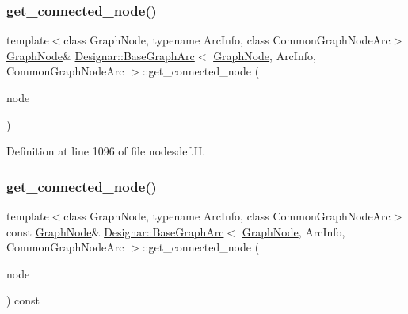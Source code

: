 \subsubsection{\texorpdfstring{get\+\_\+connected\+\_\+node()}{get\_connected\_node()}\hspace{0.1cm}{\footnotesize\ttfamily [1/2]}}
{\footnotesize\ttfamily template$<$class Graph\+Node, typename Arc\+Info, class Common\+Graph\+Node\+Arc$>$ \\
\hyperlink{class_designar_1_1_graph_node}{Graph\+Node}\& \hyperlink{class_designar_1_1_base_graph_arc}{Designar\+::\+Base\+Graph\+Arc}$<$ \hyperlink{class_designar_1_1_graph_node}{Graph\+Node}, Arc\+Info, Common\+Graph\+Node\+Arc $>$\+::get\+\_\+connected\+\_\+node (\begin{DoxyParamCaption}\item[{\hyperlink{class_designar_1_1_graph_node}{Graph\+Node} \&}]{node }\end{DoxyParamCaption})\hspace{0.3cm}{\ttfamily [inline]}}



Definition at line 1096 of file nodesdef.\+H.

\mbox{\label{class_designar_1_1_base_graph_arc_a5e8a913b9632b653908d054a7e277d7a}} 
\subsubsection{\texorpdfstring{get\+\_\+connected\+\_\+node()}{get\_connected\_node()}\hspace{0.1cm}{\footnotesize\ttfamily [2/2]}}
{\footnotesize\ttfamily template$<$class Graph\+Node, typename Arc\+Info, class Common\+Graph\+Node\+Arc$>$ \\
const \hyperlink{class_designar_1_1_graph_node}{Graph\+Node}\& \hyperlink{class_designar_1_1_base_graph_arc}{Designar\+::\+Base\+Graph\+Arc}$<$ \hyperlink{class_designar_1_1_graph_node}{Graph\+Node}, Arc\+Info, Common\+Graph\+Node\+Arc $>$\+::get\+\_\+connected\+\_\+node (\begin{DoxyParamCaption}\item[{\hyperlink{class_designar_1_1_graph_node}{Graph\+Node} \&}]{node }\end{DoxyParamCaption}) const\hspace{0.3cm}{\ttfamily [inline]}}



